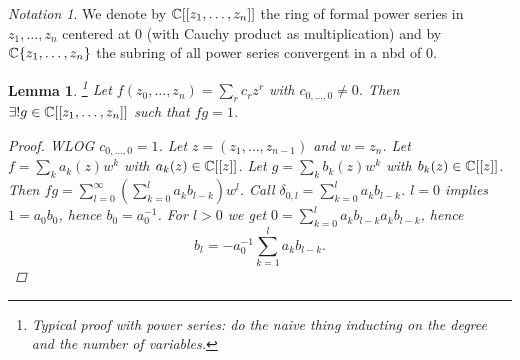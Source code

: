 \documentclass[A4paper, british]{amsart}
\theoremstyle{darkgreentheorem}
\newtheorem{lm}[thm]{Lemma}
\theoremstyle{darkbluedefinition}
\theoremstyle{darkredexample}
\theoremstyle{remark}
\newtheorem{nota}[thm]{Notation}
\newcommand{\1}{\mathbbm{1}}
\begin{document}
\begin{nota}
    We denote by $\mathbb{C}[[z_{1},\ldots,z_{n}]]$ the ring of formal power series in $z_{1},\ldots,z_{n}$ centered at $0$ (with Cauchy product as multiplication) and by $\mathbb{C}\{z_{1},\ldots,z_{n}\}$ the subring of all power series convergent in a nbd of $0$.
\end{nota}

\begin{lm}\footnote{Typical proof with power series: do the naive thing inducting on the degree and the number of variables.}
    Let $f(z_{0},\ldots,z_{n})=\sum_{r} c_{r}z^{r}$ with $c_{0,\ldots, 0}\neq 0$.
    Then $\exists !g\in \mathbb{C}[[z_{1},\ldots,z_{n}]]$ such that $fg=1$.
    \begin{proof}
	WLOG $c_{0,\ldots, 0}=1$.
	Let $z=(z_{1},\ldots,z_{n-1})$ and $w=z_{n}$.
	Let $f=\sum_{k}a_{k}(z)w^{k}$ with $a_{k}(z)\in \mathbb{C}[[z]]$.
	Let $g=\sum_{k} b_{k}(z)w^{k}$ with $b_{k}(z)\in \mathbb{C}[[z]]$.
	Then $fg=\sum_{l=0}^{\infty}(\sum_{k=0}^{l}a_{k}b_{l-k})w^{l}$.
	Call $\delta_{0,l}=\sum_{k=0}^{l}a_{k}b_{l-k}$.
	$l=0$ implies $1=a_{0}b_{0}$, hence $b_{0}=a_{0}^{-1}$.
	For $l>0$ we get $0=\sum_{k=0}^{l}a_{k}b_{l-k}a_{k}b_{l-k}$, hence
	\[b_{l}=-a_{0}^{-1}\sum_{k=1}^{l}a_{k}b_{l-k}.\]
    \end{proof}
\end{lm}
\end{document}
